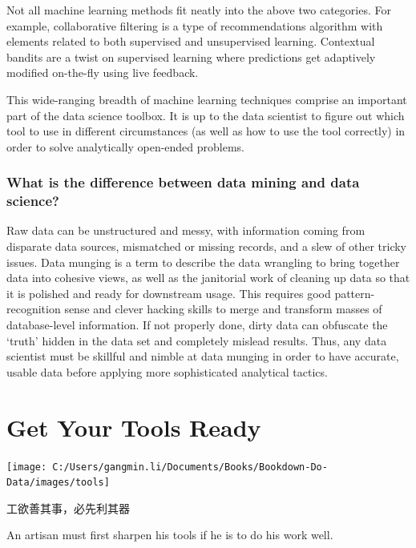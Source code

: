 \documentclass[
]{book}
\begin{document}
Not all machine learning methods fit neatly into the above two categories. For example, collaborative filtering is a type of recommendations algorithm with elements related to both supervised and unsupervised learning. Contextual bandits are a twist on supervised learning where predictions get adaptively modified on-the-fly using live feedback.

This wide-ranging breadth of machine learning techniques comprise an important part of the data science toolbox. It is up to the data scientist to figure out which tool to use in different circumstances (as well as how to use the tool correctly) in order to solve analytically open-ended problems.

\hypertarget{what-is-the-difference-between-data-mining-and-data-science}{%
\subsection{What is the difference between data mining and data science?}\label{what-is-the-difference-between-data-mining-and-data-science}}

Raw data can be unstructured and messy, with information coming from disparate data sources, mismatched or missing records, and a slew of other tricky issues. Data munging is a term to describe the data wrangling to bring together data into cohesive views, as well as the janitorial work of cleaning up data so that it is polished and ready for downstream usage. This requires good pattern-recognition sense and clever hacking skills to merge and transform masses of database-level information. If not properly done, dirty data can obfuscate the `truth' hidden in the data set and completely mislead results. Thus, any data scientist must be skillful and nimble at data munging in order to have accurate, usable data before applying more sophisticated analytical tactics.

\hypertarget{tools}{%
\chapter{Get Your Tools Ready}\label{tools}}

\begin{center}\texttt{[image: C:/Users/gangmin.li/Documents/Books/Bookdown-Do-Data/images/tools]} \end{center}

工欲善其事，必先利其器

An artisan must first sharpen his tools if he is to do his work well.
\end{document}
